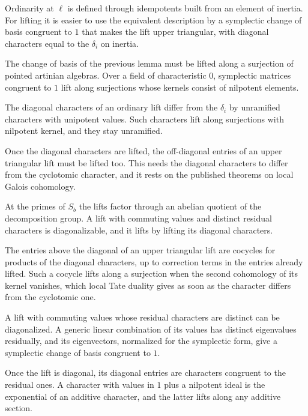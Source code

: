 Ordinarity at $\ell$ is defined through idempotents built from an element of inertia. For lifting it is easier to use the equivalent description by a symplectic change of basis congruent to $1$ that makes the lift upper triangular, with diagonal characters equal to the $\delta_i$ on inertia.

The change of basis of the previous lemma must be lifted along a surjection of pointed artinian algebras. Over a field of characteristic $0$, symplectic matrices congruent to $1$ lift along surjections whose kernels consist of nilpotent elements.

The diagonal characters of an ordinary lift differ from the $\delta_i$ by unramified characters with unipotent values. Such characters lift along surjections with nilpotent kernel, and they stay unramified.

Once the diagonal characters are lifted, the off-diagonal entries of an upper triangular lift must be lifted too. This needs the diagonal characters to differ from the cyclotomic character, and it rests on the published theorems on local Galois cohomology.

At the primes of $S_b$ the lifts factor through an abelian quotient of the decomposition group. A lift with commuting values and distinct residual characters is diagonalizable, and it lifts by lifting its diagonal characters.

The entries above the diagonal of an upper triangular lift are cocycles for products of the diagonal characters, up to correction terms in the entries already lifted. Such a cocycle lifts along a surjection when the second cohomology of its kernel vanishes, which local Tate duality gives as soon as the character differs from the cyclotomic one.

A lift with commuting values whose residual characters are distinct can be diagonalized. A generic linear combination of its values has distinct eigenvalues residually, and its eigenvectors, normalized for the symplectic form, give a symplectic change of basis congruent to $1$.

Once the lift is diagonal, its diagonal entries are characters congruent to the residual ones. A character with values in $1$ plus a nilpotent ideal is the exponential of an additive character, and the latter lifts along any additive section.

